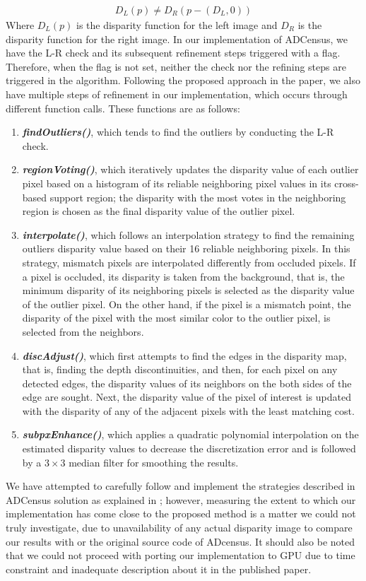 \begin{align}
D_{L}(p) \neq D_{R}(p-(D_{L},0))
\end{align}
\noindent
Where $D_{L}(p)$ is the disparity function for the left image and $D_{R}$ is the disparity function for the right image. \newline 
In our implementation of ADCensus, we have the L-R check and its subsequent refinement steps triggered with a flag.
Therefore, when the flag is not set, neither the check nor the refining steps are triggered in the algorithm.
Following the proposed approach in the paper, we also have multiple steps of refinement in our implementation, which occurs through different function calls.
These functions are as follows:
\begin{enumerate}
\item \textbf{\textit{findOutliers()}}, which tends to find the outliers by conducting the L-R check.
\item \textbf{\textit{regionVoting()}}, which iteratively updates the disparity value of each outlier pixel 
based on a histogram of its reliable neighboring pixel values in its cross-based support region; the disparity with the most votes in the neighboring region 
is chosen as the final disparity value of the outlier pixel.
\item \textbf{\textit{interpolate()}}, which follows an interpolation strategy to find the remaining outliers disparity value based on their 
16 reliable neighboring pixels. 
In this strategy, mismatch pixels are
interpolated differently from occluded pixels. If a pixel is occluded, its disparity is taken from the background, that is, the minimum disparity of its neighboring
pixels is selected as the disparity value of the outlier pixel. On the other hand, if the pixel is a mismatch point, the disparity of the pixel with the most
similar color to the outlier pixel, is selected from the neighbors.
\item \textbf{\textit{discAdjust()}}, which first attempts to find the edges in the disparity map, that is, finding the depth discontinuities, and then, for each pixel on any
detected edges, the disparity values of its neighbors on the both sides of the edge are sought. Next, the disparity value of the pixel of interest is updated with the disparity of 
any of the adjacent pixels with the least matching cost.
\item \textbf{\textit{subpxEnhance()}}, which applies a quadratic polynomial interpolation on the estimated disparity values to decrease the discretization 
error and is followed by a $3\times3$ median filter for smoothing the results.  
\end{enumerate}
We have attempted to carefully follow and implement the strategies described in ADCensus solution as explained in \cite{mei11}; however, measuring the extent to which
our implementation has come close to the proposed method is a matter we could not truly investigate, due to unavailability of any actual disparity image 
to compare our results with or the original source code of ADcensus.
It should also be noted that we could not proceed with porting our implementation to GPU due to time constraint and inadequate description
about it in the published paper.

